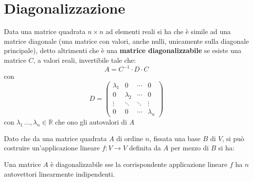 \documentclass[a4paper,12pt, oneside]{book}
\begin{document}
\section{Diagonalizzazione}
\begin{definizione}
Data una matrice quadrata $n\times n$ ad elementi reali si ha che è simile ad una matrice diagonale (una matrice con valori, anche nulli, unicamente sulla diagonale principale), detto altrimenti che è una\textbf{ matrice diagonalizzabile} se esiste una matrice $C$, a valori reali, invertibile tale che:
$$A=C^{-1}\cdot D\cdot C$$
con $$
D=\left(\begin{matrix}
\lambda_1 & 0 & \cdots & 0 \\
0 & \lambda_2 & \cdots & 0 \\
\vdots & \ddots & \ddots & \vdots \\
0 & 0 & \cdots & \lambda_n 
\end{matrix}\right)
$$
con $\lambda_1\,...,\lambda_n\in\mathbb{R}$ che ono gli autovalori di $A$
\end{definizione}
Dato che da una matrice quadrata $A$ di ordine $n$, fissata una base $B$ di $V$, si può costruire un'applicazione lineare $f:V\to V$ definita da $A$ per mezzo di $B$ si ha:
\begin{teorema}
Una matrice $A$ è diagonalizzabile sse la corrispondente applicazione lineare $f$ ha $n$ autovettori linearmente indipendenti.
\end{teorema}
\end{document}
